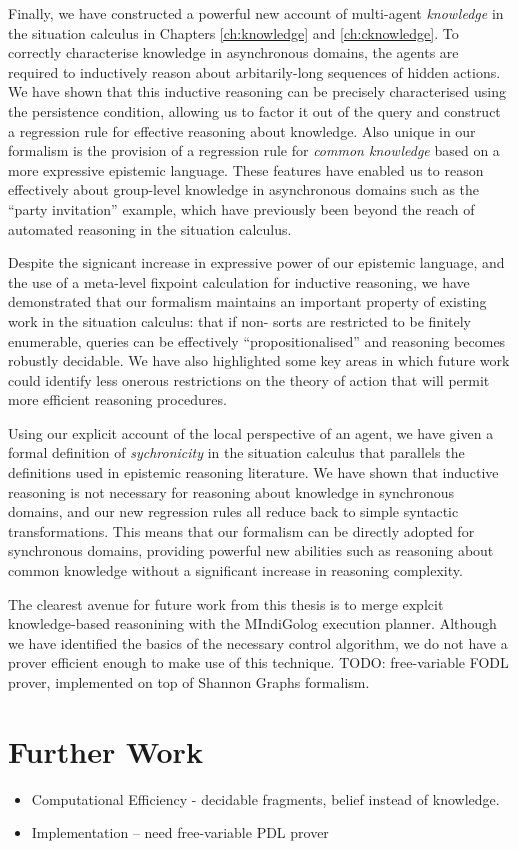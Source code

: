 Finally, we have constructed a powerful new account of multi-agent
\emph{knowledge} in the situation calculus in Chapters \ref{ch:knowledge}
and \ref{ch:cknowledge}. To correctly characterise knowledge in asynchronous
domains, the agents are required to inductively reason about arbitarily-long
sequences of hidden actions. We have shown that this inductive reasoning
can be precisely characterised using the persistence condition, allowing
us to factor it out of the query and construct a regression rule for
effective reasoning about knowledge. Also unique in our formalism
is the provision of a regression rule for \emph{common knowledge}
based on a more expressive epistemic language. These features have
enabled us to reason effectively about group-level knowledge in asynchronous
domains such as the {}``party invitation'' example, which have previously
been beyond the reach of automated reasoning in the situation calculus.

Despite the signicant increase in expressive power of our epistemic
language, and the use of a meta-level fixpoint calculation for inductive
reasoning, we have demonstrated that our formalism maintains an important
property of existing work in the situation calculus: that if non-
sorts are restricted to be finitely enumerable, queries can be effectively
{}``propositionalised'' and reasoning becomes robustly decidable.
We have also highlighted some key areas in which future work could
identify less onerous restrictions on the theory of action that will
permit more efficient reasoning procedures.

Using our explicit account of the local perspective of an agent, we
have given a formal definition of \emph{sychronicity} in the situation
calculus that parallels the definitions used in epistemic reasoning
literature. We have shown that inductive reasoning is not necessary
for reasoning about knowledge in synchronous domains, and our new
regression rules all reduce back to simple syntactic transformations.
This means that our formalism can be directly adopted for synchronous
domains, providing powerful new abilities such as reasoning about
common knowledge without a significant increase in reasoning complexity.

The clearest avenue for future work from this thesis is to merge explcit
knowledge-based reasonining with the MIndiGolog execution planner.
Although we have identified the basics of the necessary control algorithm,
we do not have a prover efficient enough to make use of this technique.
TODO: free-variable FODL prover, implemented on top of Shannon Graphs
formalism.


\section{Further Work}

\begin{itemize}
\item Computational Efficiency - decidable fragments, belief instead of
knowledge. 
\item Implementation -- need free-variable PDL prover 
\end{itemize}
